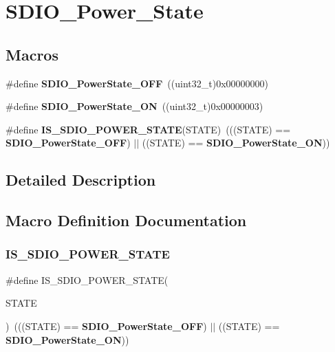 \section{S\+D\+I\+O\+\_\+\+Power\+\_\+\+State}
\label{group__SDIO__Power__State}
\subsection*{Macros}
\begin{DoxyCompactItemize}
\item 
\#define \textbf{ S\+D\+I\+O\+\_\+\+Power\+State\+\_\+\+O\+FF}~((uint32\+\_\+t)0x00000000)
\item 
\#define \textbf{ S\+D\+I\+O\+\_\+\+Power\+State\+\_\+\+ON}~((uint32\+\_\+t)0x00000003)
\item 
\#define \textbf{ I\+S\+\_\+\+S\+D\+I\+O\+\_\+\+P\+O\+W\+E\+R\+\_\+\+S\+T\+A\+TE}(S\+T\+A\+TE)~(((S\+T\+A\+TE) == \textbf{ S\+D\+I\+O\+\_\+\+Power\+State\+\_\+\+O\+FF}) $\vert$$\vert$ ((S\+T\+A\+TE) == \textbf{ S\+D\+I\+O\+\_\+\+Power\+State\+\_\+\+ON}))
\end{DoxyCompactItemize}


\subsection{Detailed Description}


\subsection{Macro Definition Documentation}
\mbox{\label{group__SDIO__Power__State_gad0dae767c2024de1769efb1feccc14ef}} 
\subsubsection{I\+S\+\_\+\+S\+D\+I\+O\+\_\+\+P\+O\+W\+E\+R\+\_\+\+S\+T\+A\+TE}
{\footnotesize\ttfamily \#define I\+S\+\_\+\+S\+D\+I\+O\+\_\+\+P\+O\+W\+E\+R\+\_\+\+S\+T\+A\+TE(\begin{DoxyParamCaption}\item[{}]{S\+T\+A\+TE }\end{DoxyParamCaption})~(((S\+T\+A\+TE) == \textbf{ S\+D\+I\+O\+\_\+\+Power\+State\+\_\+\+O\+FF}) $\vert$$\vert$ ((S\+T\+A\+TE) == \textbf{ S\+D\+I\+O\+\_\+\+Power\+State\+\_\+\+ON}))}



